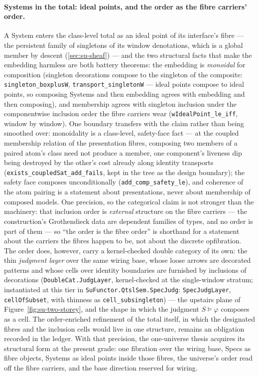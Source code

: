 \paragraph{Systems in the total: ideal points, and the order as
the fibre carriers' order.} A System enters the class-level total
as an ideal point of its interface's fibre --- the persistent family of
singletons of its window denotations, which is a global member by
descent (\autoref{sec:su-sheaf}) --- and the two structural
facts that make the embedding harmless are both battery theorems:
the embedding is \emph{monoidal} for composition (singleton
decorations compose to the singleton of the composite:
\texttt{singleton\_boxplusW}, \texttt{transport\_singletonW} ---
ideal points compose to ideal points, so composing Systems and then
embedding agrees with embedding and then composing), and
membership agrees with singleton inclusion under the
componentwise inclusion order the fibre carriers wear
(\texttt{wIdealPoint\_le\_iff}, window by window). One boundary
transfers with the claim rather than being smoothed over:
monoidality is a class-level, safety-face fact --- at the coupled
membership relation of the presentation fibres, composing two
members of a paired atom's class need not produce a member,
one component's liveness
dip being destroyed by the other's cost already along identity
transports (\texttt{exists\_coupledSat\_add\_fails}, kept in the
tree as the design boundary); the safety face composes
unconditionally
(\texttt{add\_comp\_safety\_le}), and coherence of the atom pairing
is a statement about presentations, never about membership of
composed models. One precision,
so the categorical claim is not stronger than the machinery: that
inclusion order is \emph{external} structure on the fibre carriers
--- the construction's Grothendieck data are dependent families of
types, and no order is part of them --- so ``the order is the
fibre order'' is shorthand for a statement about the carriers the
fibres happen to be, not about the discrete opfibration. The order
does, however, carry a kernel-checked double category of its own:
the thin \emph{judgment layer} over the same wiring base, whose
loose arrows are decorated patterns and whose cells over identity
boundaries are furnished by inclusions of decorations
(\texttt{DoubleCat.JudgLayer}, kernel-checked at the single-window
stratum; instantiated at this tier in
\texttt{SuFunctor.QtslSem.SpecJudg}: \texttt{SpecJudgLayer},
\texttt{cellOfSubset}, with thinness as
\texttt{cell\_subsingleton}) --- the upstairs plane of
Figure~\ref{fig:su-two-storey}, and the shape in which the judgment
$S \vDash \varphi$ composes as a cell. The order-enriched
refinement of the total itself, in which the designated fibres and
the inclusion cells would live in one structure, remains
an obligation recorded in the ledger. With that precision, the
one-universe thesis
acquires its structural form at the present grade: one fibration
over the wiring base, Specs as fibre objects, Systems as ideal
points inside those fibres, the universe's order read off the fibre
carriers, and the base direction reserved for wiring.

